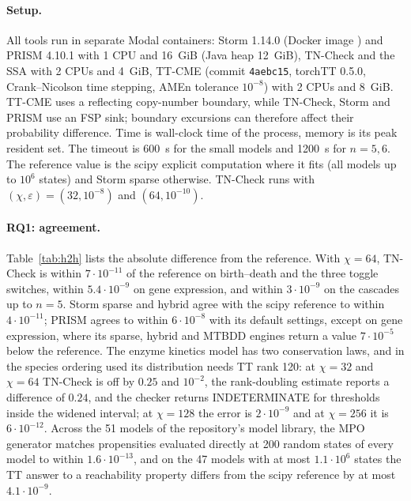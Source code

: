 \documentclass[11pt]{article}
\begin{document}
\paragraph{Setup.} All tools run in separate Modal containers: Storm 1.14.0 (Docker image
) and PRISM 4.10.1 with 1 CPU and 16~GiB (Java heap 12~GiB),
TN-Check and the SSA with 2 CPUs and 4~GiB, TT-CME (commit \texttt{4aebc15}, torchTT 0.5.0,
Crank--Nicolson time stepping, AMEn tolerance $10^{-8}$) with 2 CPUs and 8~GiB.
TT-CME uses a reflecting copy-number boundary, while TN-Check, Storm and PRISM
use an FSP sink; boundary excursions can therefore affect their probability
difference. Time is wall-clock time of the process, memory is its peak resident set. The timeout
is 600~s for the small models and 1200~s for $n=5,6$. The reference value is the scipy
explicit computation where it fits (all models up to $10^6$ states) and Storm sparse
otherwise. TN-Check runs with $(\chi,\varepsilon)=(32,10^{-8})$ and $(64,10^{-10})$.

\paragraph{RQ1: agreement.} Table~\ref{tab:h2h} lists the absolute difference from the
reference. With $\chi=64$, TN-Check is within $7\cdot10^{-11}$ of the reference on
birth--death and the three toggle switches, within $5.4\cdot10^{-9}$ on gene expression,
and within $3\cdot10^{-9}$ on the cascades up to $n=5$. Storm sparse and hybrid agree with
the scipy reference to within $4\cdot10^{-11}$; PRISM agrees to within $6\cdot10^{-8}$ with its
default settings, except on gene expression, where its sparse, hybrid and MTBDD engines
return a value $7\cdot10^{-5}$ below the reference. The enzyme kinetics model has two
conservation laws, and in the species ordering used its distribution needs TT rank 120:
at $\chi=32$ and $\chi=64$ TN-Check is off by $0.25$ and $10^{-2}$, the rank-doubling
estimate reports a difference of $0.24$, and the checker returns INDETERMINATE for
thresholds inside the widened interval; at $\chi=128$ the error is $2\cdot10^{-9}$ and at
$\chi=256$ it is $6\cdot10^{-12}$. Across the 51 models of the repository's model library,
the MPO generator matches propensities evaluated directly at 200 random states of every
model to within $1.6\cdot10^{-13}$, and on the 47 models with at most $1.1\cdot10^6$ states
the TT answer to a reachability property differs from the scipy reference by at most
$4.1\cdot10^{-9}$.
\end{document}

